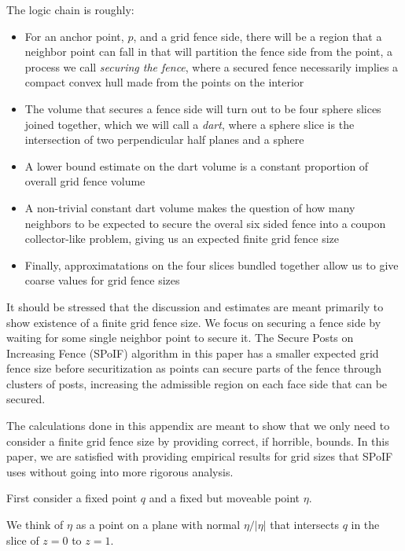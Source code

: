 \documentclass[a4paper,fleqn]{cas-dc}
\begin{document}
The logic chain is roughly:

\begin{itemize}
  \item For an anchor point, $p$, and a grid fence side, there will be a region that a neighbor
        point can fall in that will partition the fence side from the point, a process we call
        \emph{securing the fence}, where a secured fence necessarily implies a compact convex hull
        made from the points on the interior
  \item The volume that secures a fence side will turn out to be four sphere slices joined together,
        which we will call a \emph{dart}, where a sphere slice is the intersection of two perpendicular
        half planes and a sphere
  \item A lower bound estimate on the dart volume is a constant proportion of overall grid fence volume
  \item A non-trivial constant dart volume makes the question of how many neighbors to be expected
        to secure the overal six sided fence into a coupon collector-like problem, giving us an
        expected finite grid fence size
  \item Finally, approximatations on the four slices bundled together
        allow us to give coarse values for grid fence sizes
\end{itemize}

It should be stressed that the discussion and estimates are meant primarily to show existence of
a finite grid fence size.
We focus on securing a fence side by waiting for some single neighbor point to secure it.
The Secure Posts on Increasing Fence (SPoIF) algorithm in this paper has a smaller expected grid fence
size before securitization
as points can secure parts of the fence through clusters of posts, increasing the admissible
region on each face side that can be secured.

The calculations done in this appendix are meant to show that we only need to consider a finite grid fence
size by providing correct, if horrible, bounds.
In this paper, we are satisfied with providing empirical results for grid sizes that SPoIF uses without
going into more rigorous analysis.



First consider a fixed point $q$ and a fixed but moveable point $\eta$.

We think of $\eta$ as a point on a plane with normal $\eta / |\eta|$
that intersects $q$ in the slice of $z=0$ to $z=1$.
\end{document}
